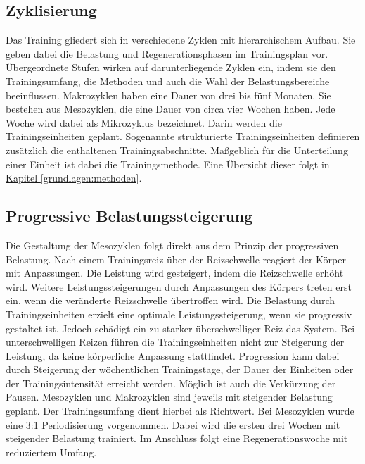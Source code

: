 \subsection{Zyklisierung}
Das Training gliedert sich in verschiedene Zyklen mit hierarchischem Aufbau. Sie geben dabei die Belastung und Regenerationsphasen im Trainingsplan vor. Übergeordnete Stufen wirken auf darunterliegende Zyklen ein, indem sie den Trainingsumfang, die Methoden und auch die Wahl der Belastungsbereiche beeinflussen. \cite[283]{Trainingswissenschaft}
Makrozyklen haben eine Dauer von drei bis fünf Monaten. Sie bestehen aus Mesozyklen, die eine Dauer von circa vier Wochen haben. Jede Woche wird dabei als Mikrozyklus bezeichnet. Darin werden die Trainingseinheiten geplant. Sogenannte strukturierte Trainingseinheiten definieren zusätzlich die enthaltenen Trainingsabschnitte. Maßgeblich für die Unterteilung einer Einheit ist dabei die Trainingsmethode. Eine Übersicht dieser folgt in \hyperref[grundlagen:methoden]{Kapitel \ref{grundlagen:methoden}}.

\subsection{Progressive Belastungssteigerung}
Die Gestaltung der Mesozyklen folgt direkt aus dem Prinzip der progressiven Belastung. Nach einem Trainingsreiz über der Reizschwelle reagiert der Körper mit Anpassungen. Die Leistung wird gesteigert, indem die Reizschwelle erhöht wird. Weitere Leistungssteigerungen durch Anpassungen des Körpers treten erst ein, wenn die veränderte Reizschwelle übertroffen wird. Die Belastung durch Trainingseinheiten erzielt eine optimale Leistungssteigerung, wenn sie progressiv gestaltet ist. Jedoch schädigt ein zu starker überschwelliger Reiz das System. Bei unterschwelligen Reizen führen die Trainingseinheiten nicht zur Steigerung der Leistung, da keine körperliche Anpassung stattfindet. \cite[58]{Seidenspinner2005} Progression kann dabei durch Steigerung der wöchentlichen Trainingstage, der Dauer der Einheiten oder der Trainingsintensität erreicht werden. Möglich ist auch die Verkürzung der Pausen.\newline 
Mesozyklen und Makrozyklen sind jeweils mit steigender Belastung geplant. Der Trainingsumfang dient hierbei als Richtwert. \cite[60-61]{Radsporttraining} Bei Mesozyklen wurde eine 3:1 Periodisierung vorgenommen. Dabei wird die ersten drei Wochen mit steigender Belastung trainiert. Im Anschluss folgt eine Regenerationswoche mit reduziertem Umfang.

